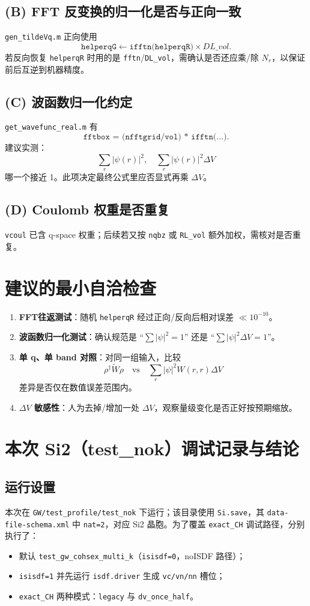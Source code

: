 \documentclass[11pt]{article}
\begin{document}
\subsection{(B) FFT 反变换的归一化是否与正向一致}
\texttt{gen\_tildeVq.m} 正向使用
\[
\texttt{helperqG} \leftarrow \texttt{ifftn(helperqR)} \times DL\_vol.
\]
若反向恢复 \texttt{helperqR} 时用的是 \texttt{fftn}/\texttt{DL\_vol}，需确认是否还应乘/除 $N_r$，以保证前后互逆到机器精度。

\subsection{(C) 波函数归一化约定}
\texttt{get\_wavefunc\_real.m} 有
\[
\texttt{fftbox = (nfftgrid/vol) * ifftn(...)}.
\]
建议实测：
\[
\sum_r |\psi(r)|^2,\quad
\sum_r |\psi(r)|^2 \Delta V
\]
哪一个接近 1。此项决定最终公式里应否显式再乘 $\Delta V$。

\subsection{(D) Coulomb 权重是否重复}
\texttt{vcoul} 已含 q-space 权重；后续若又按 \texttt{nqbz} 或 \texttt{RL\_vol} 额外加权，需核对是否重复。

\section{建议的最小自洽检查}
\begin{enumerate}
  \item \textbf{FFT往返测试}：随机 \texttt{helperqR} 经过正向/反向后相对误差 $\ll 10^{-10}$。
  \item \textbf{波函数归一化测试}：确认规范是 ``$\sum |\psi|^2=1$'' 还是 ``$\sum |\psi|^2\Delta V=1$''。
  \item \textbf{单 q、单 band 对照}：对同一组输入，比较
  \[
  \rho^\dagger \tilde W \rho
  \quad\text{vs}\quad
  \sum_r |\psi|^2 W(r,r)\Delta V
  \]
  差异是否仅在数值误差范围内。
  \item \textbf{$\Delta V$ 敏感性}：人为去掉/增加一处 $\Delta V$，观察量级变化是否正好按预期缩放。
\end{enumerate}

\section{本次 Si2（test\_nok）调试记录与结论}
\subsection{运行设置}
本次在 \texttt{GW/test\_profile/test\_nok} 下运行；该目录使用 \texttt{Si.save}，其
\texttt{data-file-schema.xml} 中 \texttt{nat=2}，对应 Si2 晶胞。为了覆盖
\texttt{exact\_CH} 调试路径，分别执行了：
\begin{itemize}
  \item 默认 \texttt{test\_gw\_cohsex\_multi\_k}（\texttt{isisdf=0}，noISDF 路径）；
  \item \texttt{isisdf=1} 并先运行 \texttt{isdf.driver} 生成 \texttt{vc/vn/nn} 槽位；
  \item \texttt{exact\_CH} 两种模式：\texttt{legacy} 与 \texttt{dv\_once\_half}。
\end{itemize}
\end{document}
